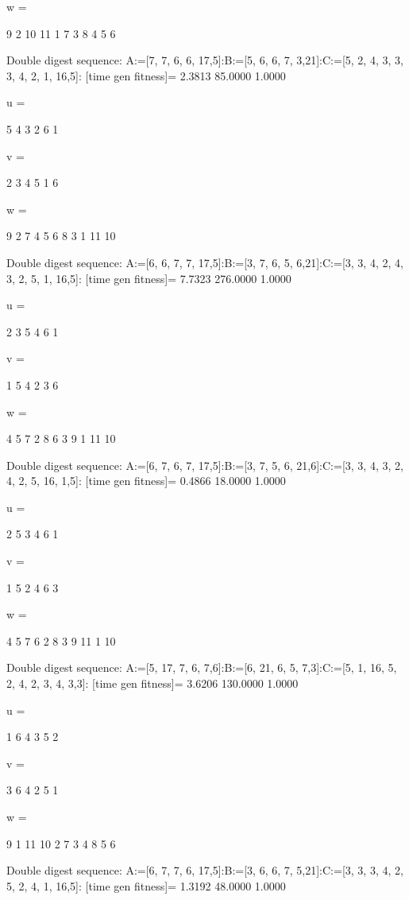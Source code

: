 w =

     9     2    10    11     1     7     3     8     4     5     6

Double digest sequence:
A:=[7, 7, 6, 6, 17,5]:B:=[5, 6, 6, 7, 3,21]:C:=[5, 2, 4, 3, 3, 3, 4, 2, 1, 16,5]:
[time gen fitness]=
    2.3813   85.0000    1.0000


u =

     5     4     3     2     6     1


v =

     2     3     4     5     1     6


w =

     9     2     7     4     5     6     8     3     1    11    10

Double digest sequence:
A:=[6, 6, 7, 7, 17,5]:B:=[3, 7, 6, 5, 6,21]:C:=[3, 3, 4, 2, 4, 3, 2, 5, 1, 16,5]:
[time gen fitness]=
    7.7323  276.0000    1.0000


u =

     2     3     5     4     6     1


v =

     1     5     4     2     3     6


w =

     4     5     7     2     8     6     3     9     1    11    10

Double digest sequence:
A:=[6, 7, 6, 7, 17,5]:B:=[3, 7, 5, 6, 21,6]:C:=[3, 3, 4, 3, 2, 4, 2, 5, 16, 1,5]:
[time gen fitness]=
    0.4866   18.0000    1.0000


u =

     2     5     3     4     6     1


v =

     1     5     2     4     6     3


w =

     4     5     7     6     2     8     3     9    11     1    10

Double digest sequence:
A:=[5, 17, 7, 6, 7,6]:B:=[6, 21, 6, 5, 7,3]:C:=[5, 1, 16, 5, 2, 4, 2, 3, 4, 3,3]:
[time gen fitness]=
    3.6206  130.0000    1.0000


u =

     1     6     4     3     5     2


v =

     3     6     4     2     5     1


w =

     9     1    11    10     2     7     3     4     8     5     6

Double digest sequence:
A:=[6, 7, 7, 6, 17,5]:B:=[3, 6, 6, 7, 5,21]:C:=[3, 3, 3, 4, 2, 5, 2, 4, 1, 16,5]:
[time gen fitness]=
    1.3192   48.0000    1.0000



